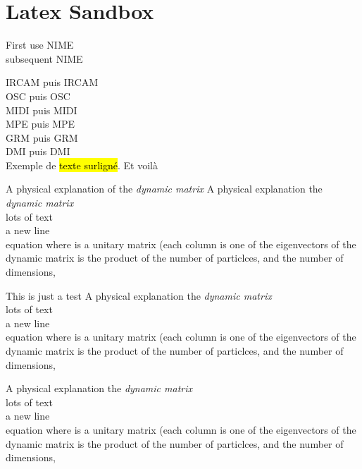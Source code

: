 %
\chapter{Latex Sandbox}
\label{ch:latex_sandbox}

First use \gls{NIME}\\
subsequent \gls{NIME}

\gls{IRCAM} puis \gls{IRCAM}\\
\gls{OSC} puis \gls{OSC}\\
\gls{MIDI} puis \gls{MIDI}\\
\gls{MPE} puis \gls{MPE}\\
\gls{GRM} puis \gls{GRM}\\
\gls{DMI} puis \gls{DMI}\\


Exemple de \hl{texte surligné}. Et voilà


\begin{titlebox}{A physical explanation of the \emph{dynamic matrix}}
A physical explanation the \emph{dynamic matrix}\\
lots of text\\
a new line\\
equation
where  is a unitary matrix (each column is one of the eigenvectors of the dynamic matrix is the product of the number of particlces, and the number of dimensions,
\end{titlebox}

\begin{notebox}{This is just a test}
A physical explanation the \emph{dynamic matrix}\\
lots of text\\
a new line\\
equation
where  is a unitary matrix (each column is one of the eigenvectors of the dynamic matrix is the product of the number of particlces, and the number of dimensions,
\end{notebox}

\begin{notebox}
A physical explanation the \emph{dynamic matrix}\\
lots of text\\
a new line\\
equation
where  is a unitary matrix (each column is one of the eigenvectors of the dynamic matrix is the product of the number of particlces, and the number of dimensions,
\end{notebox}

\blindtext

